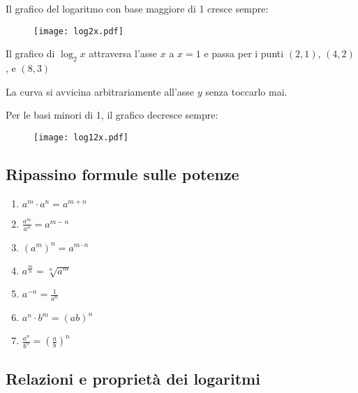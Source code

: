 Il grafico del logaritmo con base maggiore di 1 cresce sempre:

\begin{figure}[H]
\centering
\texttt{[image: log2x.pdf]}
\end{figure}

Il grafico di $\log_2x$ attraversa l'asse $x$ a $x = 1$ e passa per i punti $(2, 1)$, $(4, 2)$, e $(8, 3)$

La curva si avvicina arbitrariamente all'asse $y$  senza toccarlo mai.

Per le basi minori di 1, il grafico decresce sempre:

\begin{figure}[H]
\centering
\texttt{[image: log12x.pdf]}
\end{figure}



\subsection{Ripassino formule sulle potenze}

\begin{enumerate}
\item $a^m \cdot a^n = a^{m+n}$
\item $\frac{a^m}{a^n}=a^{m-n}$
\item $(a^m)^n=a^{m\cdot n}$
\item $a^\frac{m}{n}=\sqrt[n]{a^m}$
\item $a^{-n}=\frac{1}{a^n}$
\item $a^n \cdot b^m=(ab)^n$
\item $\frac{a^n}{b^n}=\left(\frac{a}{b}\right)^n$
\end{enumerate}


\subsection{Relazioni e proprietà dei logaritmi}

